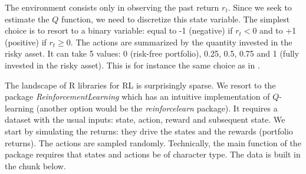 \documentclass[]{krantz}
\theoremstyle{definition}
\theoremstyle{definition}
\theoremstyle{definition}
\theoremstyle{remark}
\begin{document}
The environment consists only in observing the past return \(r_t\).
Since we seek to estimate the \(Q\) function, we need to discretize this
state variable. The simplest choice is to resort to a binary variable:
equal to -1 (negative) if \(r_t<0\) and to +1 (positive) if
\(r_t\ge 0\). The actions are summarized by the quantity invested in the
risky asset. It can take 5 values: 0 (risk-free portfolio), 0.25, 0.5,
0.75 and 1 (fully invested in the risky asset). This is for instance the
same choice as in \citet{pendharkar2018trading}.

The landscape of R libraries for RL is surprisingly sparse. We resort to
the package \emph{ReinforcementLearning} which has an intuitive
implementation of \(Q\)-learning (another option would be the
\emph{reinforcelearn} package). It requires a dataset with the usual
inputs: state, action, reward and subsequent state. We start by
simulating the returns: they drive the states and the rewards (portfolio
returns). The actions are sampled randomly. Technically, the main
function of the package requires that states and actions be of character
type. The data is built in the chunk below.

\footnotesize
\end{document}
